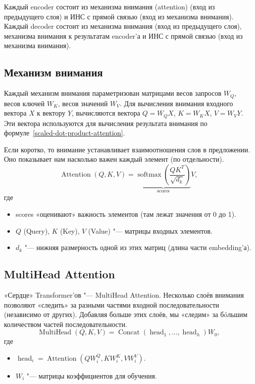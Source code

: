 Каждый encoder состоит из механизма внимания (attention) (вход из предыдущего слоя) и ИНС с прямой связью (вход из механизма внимания). Каждый decoder состоит из механизма внимания (вход из предыдущего слоя), механизма внимания к результатам encoder'а и ИНС с прямой связью (вход из механизма внимания).


\subsection{Механизм внимания}


Каждый механизм внимания параметризован матрицами весов запросов $W_{Q}$, весов ключей $W_{K}$, весов значений $W_{V}$. Для вычисления внимания входного вектора $X$ к вектору $Y$, вычисляются вектора $Q=W_{Q}X$, $K=W_{K}X$, $V=W_{V}Y$. Эти вектора используются для вычисления результата внимания по формуле~\eqref{scaled-dot-product-attention}.

Если коротко, то внимание устанавливает взаимоотношения слов в предложении. Оно показывает нам насколько важен каждый элемент (по отдельности).
\begin{equation}\label{scaled-dot-product-attention}%
  \operatorname{Attention}(Q, K, V) = \underbrace{
    \operatorname{softmax}\left(
      \frac{QK^T}{\sqrt{d_k}}
    \right)
  }_{\text{scores}}
  V,
\end{equation}
где
\begin{itemize}%
  \item scores «оценивают» важность элементов (там лежат значения от 0 до 1).
  \item $Q$ (Query), $K$ (Key), $V$ (Value) "--- матрицы входных элементов.
  \item $d_k$ "--- нижняя размерность одной из этих матриц (длина части embedding'а).
\end{itemize}


\subsection{MultiHead Attention}


«Сердце» Transformer'ов "--- MultiHead Attention.
Несколько слоёв внимания позволяют «следить» за разными частями входной последовательности (независимо от других).
Добавляя больше этих слоёв, мы «следим» за бóльшим количеством частей последовательности.
\begin{equation}\label{multihead-attention-mechanism}%
  \operatorname{MultiHead}(Q, K, V) = \operatorname{Concat}\left(\operatorname{head}_1, \ldots, \operatorname{head}_h \right) W_0,
\end{equation}
где
\begin{itemize}%
  \item $\operatorname{head}_i = \operatorname{Attention}(QW_i^Q, KW_i^K, VW_i^V) $.
  \item $W_i$ "--- матрицы коэффициентов для обучения.
\end{itemize}


